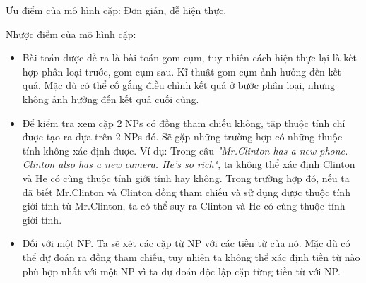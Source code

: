\documentclass[12pt]{report}
\begin{document}
				\par Ưu điểm của mô hình cặp: Đơn giản, dễ hiện thực.
				\par Nhược điểm của mô hình cặp:
					\begin{itemize}
						\item{Bài toán được đề ra là bài toán gom cụm, tuy nhiên cách hiện thực lại là kết hợp phân loại trước, gom cụm sau. Kĩ thuật gom cụm ảnh hưởng đến kết quả. Mặc dù có thể cố gắng điều chỉnh kết quả ở bước phân loại, nhưng không ảnh hưởng đến kết quả cuối cùng.}
						\item{Để kiểm tra xem cặp 2 NPs có đồng tham chiếu không, tập thuộc tính chỉ được tạo ra dựa trên 2 NPs đó. Sẽ gặp những trường hợp có những thuộc tính không xác định được. Ví dụ: Trong câu \textit{"Mr.Clinton has a new phone. Clinton also has a new camera. He’s so rich"}, ta không thể xác định Clinton và He có cùng thuộc tính giới tính hay không. Trong trường hợp đó, nếu ta đã biết Mr.Clinton và Clinton đồng tham chiếu và sử dụng được thuộc tính giới tính từ Mr.Clinton, ta có thể suy ra Clinton và He có cùng thuộc tính giới tính.}
						\item{Đối với một NP. Ta sẽ xét các cặp từ NP với các tiền từ của nó. Mặc dù có thể dự đoán ra đồng tham chiếu, tuy nhiên ta không thể xác định tiền từ nào phù hợp nhất với một NP vì ta dự đoán độc lập cặp từng tiền từ với NP.}
					\end{itemize}
\end{document}

